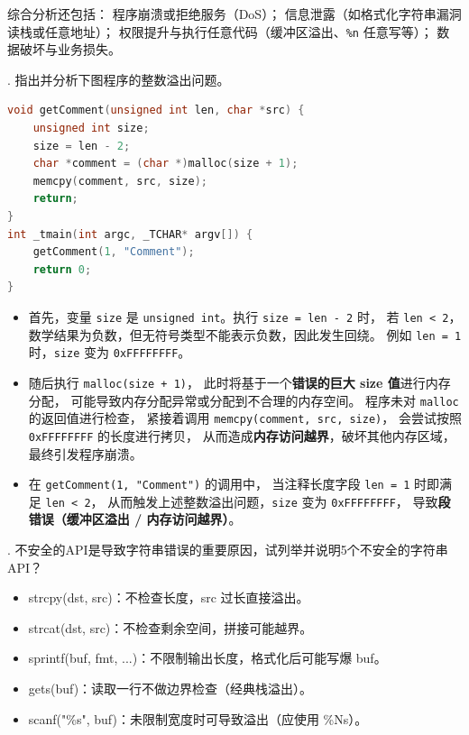 \documentclass[UTF8]{ctexart}
\begin{document}
综合分析还包括：
程序崩溃或拒绝服务（DoS）；
信息泄露（如格式化字符串漏洞读栈或任意地址）；
权限提升与执行任意代码（缓冲区溢出、\texttt{\%n} 任意写等）；
数据破坏与业务损失。


. 指出并分析下图程序的整数溢出问题。

\begin{lstlisting}[language=C]
void getComment(unsigned int len, char *src) {
    unsigned int size;
    size = len - 2;
    char *comment = (char *)malloc(size + 1);
    memcpy(comment, src, size);
    return;
}
int _tmain(int argc, _TCHAR* argv[]) {
    getComment(1, "Comment");
    return 0;
}
\end{lstlisting}


\begin{tcolorbox}[title=答题区, height=6.5cm]
\end{tcolorbox}


\begin{itemize}
  \item [(1)]首先，变量 \texttt{size} 是 \texttt{unsigned int}。执行 \texttt{size = len - 2} 时，
若 \texttt{len < 2}，数学结果为负数，但无符号类型不能表示负数，因此发生回绕。
例如 \texttt{len = 1} 时，\texttt{size} 变为 \texttt{0xFFFFFFFF}。
  \item [(2)]随后执行 \texttt{malloc(size + 1)}，
此时将基于一个\textbf{错误的巨大 size 值}进行内存分配，
可能导致内存分配异常或分配到不合理的内存空间。
程序未对 \texttt{malloc} 的返回值进行检查，
紧接着调用 \texttt{memcpy(comment, src, size)}，
会尝试按照 \texttt{0xFFFFFFFF} 的长度进行拷贝，
从而造成\textbf{内存访问越界}，破坏其他内存区域，
最终引发程序崩溃。
  \item [(3)]在 \texttt{getComment(1, "Comment")} 的调用中，
当注释长度字段 \texttt{len = 1} 时即满足 \texttt{len < 2}，
从而触发上述整数溢出问题，\texttt{size} 变为 \texttt{0xFFFFFFFF}，
导致\textbf{段错误（缓冲区溢出 / 内存访问越界）}。
\end{itemize}

. 不安全的API是导致字符串错误的重要原因，试列举并说明5个不安全的字符串API？


\begin{tcolorbox}[title=答题区, height=4.5cm]
\end{tcolorbox}

\begin{itemize}
  \item strcpy(dst, src)：不检查长度，src 过长直接溢出。
  \item strcat(dst, src)：不检查剩余空间，拼接可能越界。
  \item sprintf(buf, fmt, ...)：不限制输出长度，格式化后可能写爆 buf。
  \item gets(buf)：读取一行不做边界检查（经典栈溢出）。
  \item scanf("\%s", buf)：未限制宽度时可导致溢出（应使用 \%Ns）。
\end{itemize}
\end{document}
